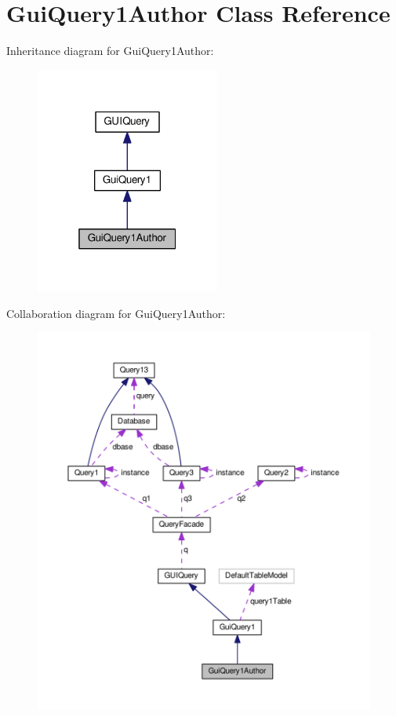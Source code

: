 \hypertarget{classGuiQuery1Author}{}\section{Gui\+Query1\+Author Class Reference}
\label{classGuiQuery1Author}


Inheritance diagram for Gui\+Query1\+Author\+:\nopagebreak
\begin{figure}[H]
\begin{center}
\leavevmode
\includegraphics[width=172pt]{classGuiQuery1Author__inherit__graph}
\end{center}
\end{figure}


Collaboration diagram for Gui\+Query1\+Author\+:\nopagebreak
\begin{figure}[H]
\begin{center}
\leavevmode
\includegraphics[width=350pt]{classGuiQuery1Author__coll__graph}
\end{center}
\end{figure}
